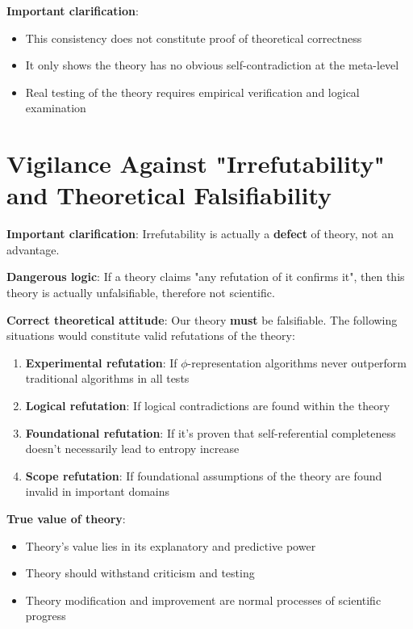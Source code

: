 \textbf{Important clarification}:
\begin{itemize}
\item This consistency does not constitute proof of theoretical correctness
\item It only shows the theory has no obvious self-contradiction at the meta-level
\item Real testing of the theory requires empirical verification and logical examination
\end{itemize}

\section{Vigilance Against "Irrefutability" and Theoretical Falsifiability}
\label{sec:ch09_defense:vigilance-against-irrefutability-and-theoretical-falsifiability}

\textbf{Important clarification}: Irrefutability is actually a \textbf{defect} of theory, not an advantage.

\textbf{Dangerous logic}:
If a theory claims "any refutation of it confirms it", then this theory is actually unfalsifiable, therefore not scientific.

\textbf{Correct theoretical attitude}:
Our theory \textbf{must} be falsifiable. The following situations would constitute valid refutations of the theory:

\begin{enumerate}
\item \textbf{Experimental refutation}: If $\phi$-representation algorithms never outperform traditional algorithms in all tests
\item \textbf{Logical refutation}: If logical contradictions are found within the theory
\item \textbf{Foundational refutation}: If it's proven that self-referential completeness doesn't necessarily lead to entropy increase
\item \textbf{Scope refutation}: If foundational assumptions of the theory are found invalid in important domains
\end{enumerate}

\textbf{True value of theory}:
\begin{itemize}
\item Theory's value lies in its explanatory and predictive power
\item Theory should withstand criticism and testing
\item Theory modification and improvement are normal processes of scientific progress
\end{itemize}

